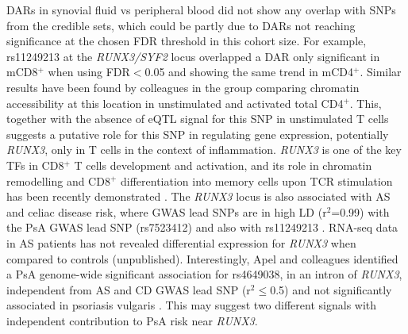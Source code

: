 DARs in synovial fluid vs peripheral blood did not show any overlap with SNPs from the credible sets, which could be partly due to DARs not reaching significance at the chosen FDR threshold in this cohort size. %
For example, rs11249213 at the \textit{RUNX3/SYF2} locus overlapped a DAR only significant in mCD8$^+$ when using FDR$<$0.05 and showing the same trend in mCD4$^+$. Similar results have been found by colleagues in the group comparing chromatin accessibility at this location in unstimulated and activated total CD4$^+$. This, together with the absence of eQTL signal for this SNP in unstimulated T cells suggests a putative role for this SNP in regulating gene expression, potentially \textit{RUNX3}, only in T cells in the context of inflammation. \textit{RUNX3} is one of the key TFs in CD8$^+$ T cells development and activation, and its role in chromatin remodelling and CD8$^+$ differentiation into memory cells upon TCR stimulation has been recently demonstrated \parencite{Woolf2003,Lotem2013,Wang2018}. The \textit{RUNX3} locus is also associated with AS and celiac disease risk, where GWAS lead SNPs are in high LD (r$^2$=0.99) with the PsA GWAS lead SNP (rs7523412) and also with rs11249213 \parencite{Reveille2010,Dubois2010}. RNA-seq data in AS patients has not revealed differential expression for \textit{RUNX3} when compared to controls (unpublished). Interestingly, Apel and colleagues identified a PsA genome-wide significant association for rs4649038, in an intron of \textit{RUNX3}, independent from AS and CD GWAS lead SNP (r$^2$$\leq$0.5) and not significantly associated in psoriasis vulgaris \parencite{Apel2013}. This may suggest two different signals with independent contribution to PsA risk near \textit{RUNX3}.


